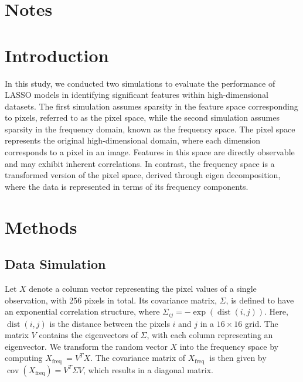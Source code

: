 \documentclass[12pt]{article}
\title{}
\author{Siyang Ren}
\begin{document}
\maketitle

\section*{Notes}

\section*{Introduction}

In this study, we conducted two simulations to evaluate the performance of LASSO models in identifying significant features within high-dimensional datasets. The first simulation assumes sparsity in the feature space corresponding to pixels, referred to as the pixel space, while the second simulation assumes sparsity in the frequency domain, known as the frequency space. The pixel space represents the original high-dimensional domain, where each dimension corresponds to a pixel in an image. Features in this space are directly observable and may exhibit inherent correlations. In contrast, the frequency space is a transformed version of the pixel space, derived through eigen decomposition, where the data is represented in terms of its frequency components.


\section*{Methods}

\subsection*{Data Simulation}

Let \( X \) denote a column vector representing the pixel values of a single observation, with 256 pixels in total. Its covariance matrix, \( \Sigma \), is defined to have an exponential correlation structure, where \( \Sigma_{i j}=-\exp (\operatorname{dist}(i, j)) \). Here, \( \operatorname{dist}(i, j) \) is the distance between the pixels \( i \) and \( j \) in a \( 16 \times 16 \) grid. The matrix \( V \) contains the eigenvectors of \( \Sigma \), with each column representing an eigenvector. We transform the random vector \( X \) into the frequency space by computing \( X_{\text {freq }}=V^T X \). The covariance matrix of \( X_{\text {freq }} \) is then given by \( \operatorname{cov}(X_{\mathrm{freq}})=V^T \Sigma V \), which results in a diagonal matrix.
\end{document}
